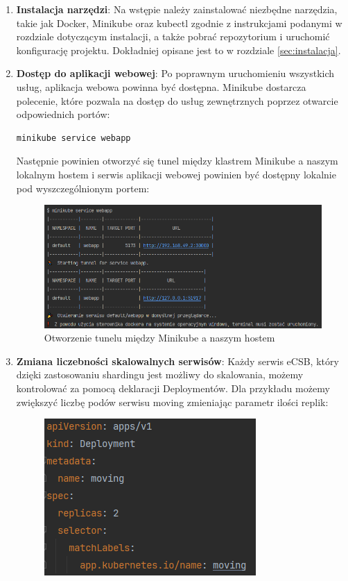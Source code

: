 \documentclass[polish]{aghengthesis}
\begin{document}
\begin{enumerate}
    \item \textbf{Instalacja narzędzi}:
    Na wstępie należy zainstalować niezbędne narzędzia, takie jak Docker, Minikube oraz kubectl zgodnie z instrukcjami podanymi w rozdziale dotyczącym instalacji, a także pobrać repozytorium i uruchomić konfigurację projektu. Dokładniej opisane jest to w rozdziale \ref{sec:instalacja}.

    \item \textbf{Dostęp do aplikacji webowej}:
    Po poprawnym uruchomieniu wszystkich usług, aplikacja webowa powinna być dostępna. Minikube dostarcza polecenie, które pozwala na dostęp do usług zewnętrznych poprzez otwarcie odpowiednich portów:
\begin{lstlisting}[basicstyle=\ttfamily, numbers=none]
minikube service webapp\end{lstlisting}\vspace{-20pt}
Następnie powinien otworzyć się tunel między klastrem Minikube a naszym lokalnym hostem i serwis aplikacji webowej powinien być dostępny lokalnie pod wyszczególnionym portem:
\begin{figure}[!htbp]
    \centering
    \includegraphics[width=0.9\linewidth]{resources/webapp expose.PNG}
    \caption{Otworzenie tunelu między Minikube a naszym hostem}
    \label{fig:tunel}
\end{figure}
\newpage
    \item \textbf{Zmiana liczebności skalowalnych serwisów}:
    Każdy serwis eCSB, który dzięki zastosowaniu shardingu jest możliwy do skalowania, możemy kontrolować za pomocą deklaracji Deploymentów. Dla przykładu możemy zwiększyć liczbę podów serwisu moving zmieniając parametr ilości replik:
\begin{figure}[!htbp]
    \centering
    \includegraphics[width=0.6\linewidth]{resources/moving_replicas.PNG}

\end{figure}
\end{enumerate}
\end{document}
